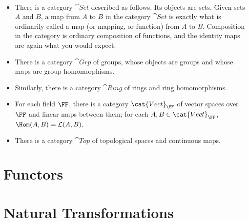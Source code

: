 \begin{example} \
\begin{itemize}
\item There is a category $\cat{Set}$ described as follows. Its objects are sets. Given sets $A$ and $B$, a map from $A$ to $B$ in the category $\cat{Set}$ is exactly what is ordinarily called a map (or mapping, or function) from $A$ to $B$. Composition in the category is ordinary composition of functions, and the identity maps are again what you would expect.
\item There is a category $\cat{Grp}$ of groups, whose objects are groups and whose maps are group homomorphisms.
\item Similarly, there is a category $\cat{Ring}$ of rings and ring homomorphisms.
\item For each field $\FF$, there is a category $\cat{Vect}_\FF$ of vector spaces over $\FF$ and linear maps between them; for each $A,B\in\cat{Vect}_\FF$, $\Hom(A,B)=\mathcal{L}(A,B)$.
\item There is a category $\cat{Top}$ of topological spaces and continuous maps.
\end{itemize}
\end{example}

\section{Functors}

\section{Natural Transformations}
